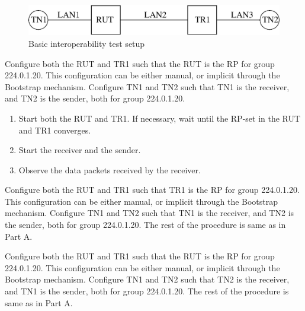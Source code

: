 \documentclass[11pt]{report}
\begin{document}
\begin{figure}[htbp]
  \begin{center}
    \includegraphics[scale=0.8]{figs/pim_test_1_1_basic_interoperability}
    \caption{Basic interoperability test setup}
    \label{fig:basic_interoperability}
  \end{center}
\end{figure}



Configure both the RUT and TR1 such that the RUT is the RP for group
224.0.1.20. This configuration can be either manual, or implicit through the
Bootstrap mechanism. Configure TN1 and TN2 such that TN1 is the receiver, and
TN2 is the sender, both for group 224.0.1.20.

\begin{enumerate}

  \item Start both the RUT and TR1. If necessary, wait until the RP-set in the
        RUT and TR1 converges.

  \item Start the receiver and the sender.

  \item Observe the data packets received by the receiver.

\end{enumerate}


Configure both the RUT and TR1 such that TR1 is the RP for group
224.0.1.20. This configuration can be either manual, or implicit through the
Bootstrap mechanism. Configure TN1 and TN2 such that TN1 is the receiver, and
TN2 is the sender, both for group 224.0.1.20. The rest of the procedure is
same as in Part A.


Configure both the RUT and TR1 such that the RUT is the RP for group
224.0.1.20. This configuration can be either manual, or implicit through the 
Bootstrap mechanism. Configure TN1 and TN2 such that TN2 is the receiver, and
TN1 is the sender, both for group 224.0.1.20. The rest of the procedure is
same as in Part A.
\end{document}

